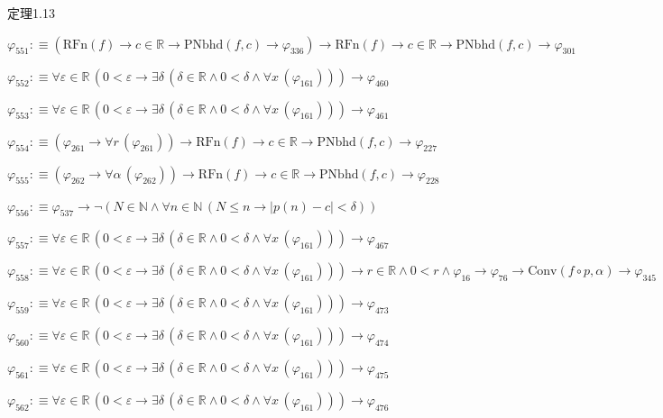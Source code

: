 \begin{fullproof}{定理1.13}
\begin{abbrevlist}
\item $\varphi_{551} :\equiv (\mathrm{RFn}(f) \to c \in \mathbb{R} \to \mathrm{PNbhd}(f,c) \to \varphi_{336}) \to \mathrm{RFn}(f) \to c \in \mathbb{R} \to \mathrm{PNbhd}(f,c) \to \varphi_{301}$
\item $\varphi_{552} :\equiv \forall \varepsilon \in \mathbb{R}\,(0 < \varepsilon \to \exists \delta\,(\delta \in \mathbb{R} \land 0 < \delta \land \forall x\,(\varphi_{161}))) \to \varphi_{460}$
\item $\varphi_{553} :\equiv \forall \varepsilon \in \mathbb{R}\,(0 < \varepsilon \to \exists \delta\,(\delta \in \mathbb{R} \land 0 < \delta \land \forall x\,(\varphi_{161}))) \to \varphi_{461}$
\item $\varphi_{554} :\equiv (\varphi_{261} \to \forall r\,(\varphi_{261})) \to \mathrm{RFn}(f) \to c \in \mathbb{R} \to \mathrm{PNbhd}(f,c) \to \varphi_{227}$
\item $\varphi_{555} :\equiv (\varphi_{262} \to \forall \alpha\,(\varphi_{262})) \to \mathrm{RFn}(f) \to c \in \mathbb{R} \to \mathrm{PNbhd}(f,c) \to \varphi_{228}$
\item $\varphi_{556} :\equiv \varphi_{537} \to \neg (N \in \mathbb{N} \land \forall n \in \mathbb{N}\,(N \leq n \to \lvert p(n) - c \rvert < \delta))$
\item $\varphi_{557} :\equiv \forall \varepsilon \in \mathbb{R}\,(0 < \varepsilon \to \exists \delta\,(\delta \in \mathbb{R} \land 0 < \delta \land \forall x\,(\varphi_{161}))) \to \varphi_{467}$
\item $\varphi_{558} :\equiv \forall \varepsilon \in \mathbb{R}\,(0 < \varepsilon \to \exists \delta\,(\delta \in \mathbb{R} \land 0 < \delta \land \forall x\,(\varphi_{161}))) \to r \in \mathbb{R} \land 0 < r \land \varphi_{16} \to \varphi_{76} \to \mathrm{Conv}(f \circ p,\alpha) \to \varphi_{345}$
\item $\varphi_{559} :\equiv \forall \varepsilon \in \mathbb{R}\,(0 < \varepsilon \to \exists \delta\,(\delta \in \mathbb{R} \land 0 < \delta \land \forall x\,(\varphi_{161}))) \to \varphi_{473}$
\item $\varphi_{560} :\equiv \forall \varepsilon \in \mathbb{R}\,(0 < \varepsilon \to \exists \delta\,(\delta \in \mathbb{R} \land 0 < \delta \land \forall x\,(\varphi_{161}))) \to \varphi_{474}$
\item $\varphi_{561} :\equiv \forall \varepsilon \in \mathbb{R}\,(0 < \varepsilon \to \exists \delta\,(\delta \in \mathbb{R} \land 0 < \delta \land \forall x\,(\varphi_{161}))) \to \varphi_{475}$
\item $\varphi_{562} :\equiv \forall \varepsilon \in \mathbb{R}\,(0 < \varepsilon \to \exists \delta\,(\delta \in \mathbb{R} \land 0 < \delta \land \forall x\,(\varphi_{161}))) \to \varphi_{476}$

\end{abbrevlist}
\end{fullproof}
